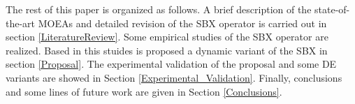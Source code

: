 The rest of this paper is organized as follows.
%
A brief description of the state-of-the-art MOEAs and detailed revision of the SBX operator is carried out in section \ref{LiteratureReview}.
%
Some empirical studies of the SBX operator are realized.
%
Based in this stuides is proposed a dynamic variant of the SBX in section \ref{Proposal}.
%
The experimental validation of the proposal and some DE variants are showed in Section \ref{Experimental_Validation}.
%
Finally, conclusions and some lines of future work are given in Section \ref{Conclusions}.
